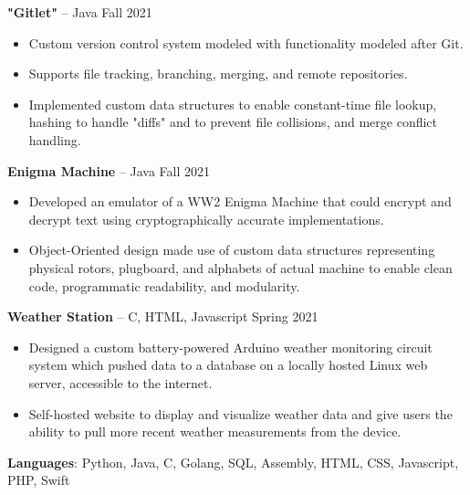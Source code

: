 \documentclass{article}
\begin{document}
    \vspace{2mm}

    \noindent \textbf{"Gitlet"} -- Java \hfill Fall 2021 
    \begin{itemize}
        \item Custom version control system modeled with functionality modeled after Git.
        \item Supports file tracking, branching, merging, and remote repositories.
        \item Implemented custom data structures to enable constant-time file lookup, hashing to handle "diffs" and to prevent file collisions, and merge conflict handling.
    \end{itemize}

    \vspace{2mm}

    \noindent \textbf{Enigma Machine} -- Java \hfill Fall 2021
    \begin{itemize}
        \item Developed an emulator of a WW2 Enigma Machine that could encrypt and decrypt text using cryptographically accurate implementations.
        \item Object-Oriented design made use of custom data structures representing physical rotors, plugboard, and alphabets of actual machine to enable clean code, programmatic readability, and modularity.
    \end{itemize} 

    \vspace{2mm}

    \noindent \textbf{Weather Station} -- C, HTML, Javascript \hfill Spring 2021
    \begin{itemize}
        \item Designed a custom battery-powered Arduino weather monitoring circuit system which pushed data to a database on a locally hosted Linux web server, accessible to the internet. 
        \item Self-hosted website to display and visualize weather data and give users the ability to pull more recent weather measurements from the device.
    \end{itemize}

    \vspace{-2mm}


    \noindent \textbf{Languages}: Python, Java, C, Golang, SQL, Assembly, HTML, CSS, Javascript, PHP, Swift
    
\end{document}
